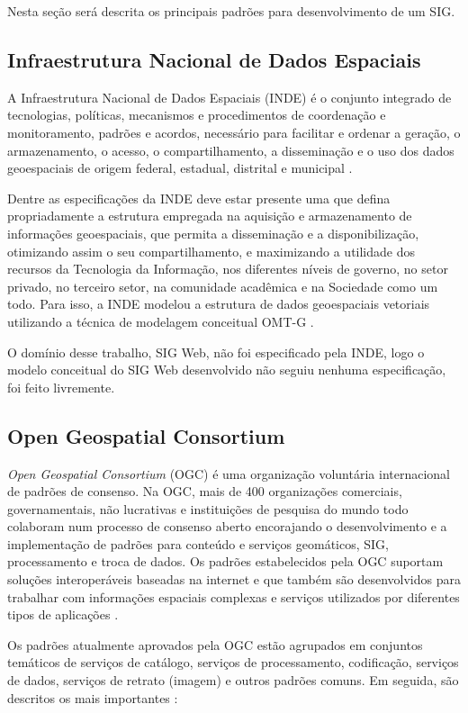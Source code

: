 Nesta seção será descrita os principais padrões para desenvolvimento de um SIG.

\subsection{Infraestrutura Nacional de Dados Espaciais}

A Infraestrutura Nacional de Dados Espaciais (INDE) é o conjunto integrado de tecnologias, políticas, mecanismos e procedimentos de coordenação e monitoramento, padrões e acordos, necessário para facilitar e ordenar a geração, o armazenamento, o acesso, o compartilhamento, a disseminação e o uso dos dados geoespaciais de origem federal, estadual, distrital e municipal \cite{inde}.

Dentre as especificações da INDE deve estar presente uma que defina propriadamente a estrutura empregada na aquisição e armazenamento de informações geoespaciais, que permita a disseminação e a disponibilização, otimizando assim o seu compartilhamento, e maximizando a utilidade dos recursos da Tecnologia da Informação, nos diferentes níveis de governo, no setor privado, no terceiro setor, na comunidade acadêmica e na Sociedade como um todo. Para isso, a INDE modelou a estrutura de dados geoespaciais vetoriais utilizando a técnica de modelagem conceitual OMT-G \cite{concar}.

O domínio desse trabalho, SIG Web, não foi especificado pela INDE, logo o modelo conceitual do SIG Web desenvolvido não seguiu nenhuma especificação, foi feito livremente.

\subsection{Open Geospatial Consortium}

\textit{Open Geospatial Consortium} (OGC) é uma organização voluntária internacional de padrões de consenso. Na OGC, mais de 400 organizações comerciais, governamentais, não lucrativas e instituições de pesquisa do mundo todo colaboram num processo de consenso aberto encorajando o desenvolvimento e a implementação de padrões para conteúdo e serviços geomáticos, SIG, processamento e troca de dados. Os padrões estabelecidos pela OGC suportam soluções interoperáveis baseadas na internet e que também são desenvolvidos para trabalhar com informações espaciais complexas e serviços utilizados por diferentes tipos de aplicações \cite{ogc}.

Os padrões atualmente aprovados pela OGC estão agrupados em conjuntos temáticos de serviços de catálogo, serviços de processamento, codificação, serviços de dados, serviços de retrato (imagem) e outros padrões comuns. Em seguida, são descritos os mais importantes \cite{harley, ogc}:

